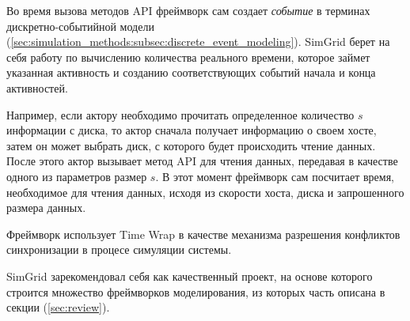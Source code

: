 \documentclass[../diploma.tex]{subfile}
\begin{document}
    Во время вызова методов API фреймворк сам создает \textit{событие} в
    терминах дискретно-событийной модели
    (\ref{sec:simulation_methods:subsec:discrete_event_modeling}). SimGrid берет
    на себя работу по вычислению количества реального времени, которое займет
    указанная активность и созданию соответствующих событий начала и конца
    активностей. 
    
    Например, если актору необходимо прочитать определенное количество $s$
    информации с диска, то актор сначала получает информацию о своем хосте,
    затем он может выбрать диск, с которого будет происходить чтение данных.
    После этого актор вызывает метод API для чтения данных, передавая в качестве
    одного из параметров размер $s$. В этот момент фреймворк сам посчитает
    время, необходимое для чтения данных, исходя из скорости хоста, диска и
    запрошенного размера данных. 

    Фреймворк использует Time Wrap в качестве механизма разрешения конфликтов
    синхронизации в процесе симуляции системы.

    SimGrid зарекомендовал себя как качественный проект, на основе которого
    строится множество фреймворков моделирования, из которых часть описана в
    секции (\ref{sec:review}).
\end{document}
